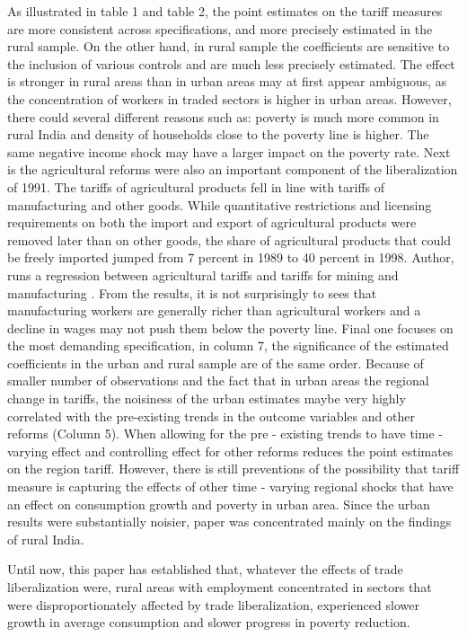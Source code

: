 \documentclass[a4paper,12pt]{article}
\begin{document}
As illustrated in table 1 and table 2, the point estimates on the tariff measures are more consistent across specifications, and more precisely estimated in the rural sample. On the other hand, in rural sample the coefficients are sensitive to the inclusion of various controls and are much less precisely estimated.  The effect is stronger in rural areas than in urban areas may at first appear ambiguous, as the concentration of workers in traded  sectors is higher in urban areas. However, there could several different reasons such as: poverty is much more common in rural India and density of households close to the poverty line is higher. The same negative income shock may have a larger impact on the poverty rate.  Next is the agricultural reforms were also an important component of the liberalization of 1991. The tariffs of agricultural products fell in line  with tariffs of manufacturing and other goods. While quantitative restrictions and licensing requirements on both the import and export of agricultural products  were removed later than on other goods, the share of agricultural products that could be freely imported jumped from 7 percent in 1989 to 40 percent in 1998. Author, runs a regression between agricultural tariffs and tariffs for mining and manufacturing . From the results, it is not surprisingly to sees that manufacturing workers are generally richer than agricultural workers and a decline in wages may not push them below the poverty line.  Final one focuses on the most demanding specification, in column 7, the significance of the estimated coefficients  in the urban and rural sample are of the same order. Because of smaller number of observations and the fact that in urban areas the regional change in tariffs, the noisiness of the urban estimates maybe very highly correlated with the pre-existing trends in the outcome variables and other reforms (Column 5). When allowing for the pre - existing trends to have time - varying effect and controlling effect for other reforms reduces the point estimates on the region tariff. However, there is still preventions of the possibility that tariff measure is capturing the effects of other time - varying regional shocks that have an effect on consumption growth and poverty in urban area. Since the urban results were substantially noisier, paper was concentrated mainly on the findings of rural India. 

Until now, this paper has established that, whatever the effects of trade liberalization were, rural areas with employment concentrated in sectors that were disproportionately affected by trade liberalization, experienced slower growth in average consumption and slower progress in poverty reduction.    
\end{document}
